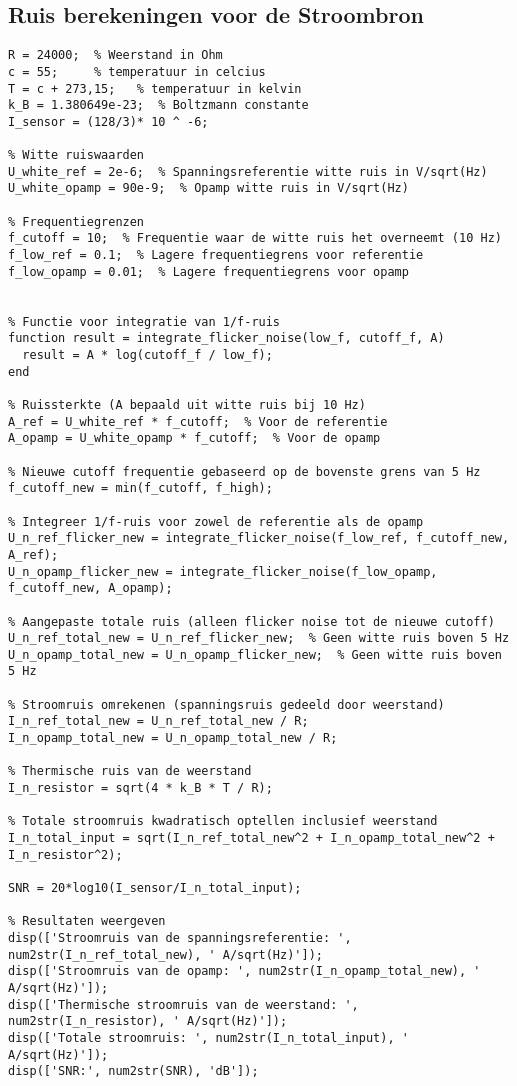 \subsection{Ruis berekeningen voor de Stroombron}
\begin{lstlisting}[caption={Octave code voor de ruis berekeningen van de Stroombron}, label={lst:octave_code_noise_current}]
% Gegeven waarden
R = 24000;  % Weerstand in Ohm
c = 55;     % temperatuur in celcius
T = c + 273,15;   % temperatuur in kelvin
k_B = 1.380649e-23;  % Boltzmann constante
I_sensor = (128/3)* 10 ^ -6;

% Witte ruiswaarden
U_white_ref = 2e-6;  % Spanningsreferentie witte ruis in V/sqrt(Hz)
U_white_opamp = 90e-9;  % Opamp witte ruis in V/sqrt(Hz)

% Frequentiegrenzen
f_cutoff = 10;  % Frequentie waar de witte ruis het overneemt (10 Hz)
f_low_ref = 0.1;  % Lagere frequentiegrens voor referentie
f_low_opamp = 0.01;  % Lagere frequentiegrens voor opamp


% Functie voor integratie van 1/f-ruis
function result = integrate_flicker_noise(low_f, cutoff_f, A)
  result = A * log(cutoff_f / low_f);
end

% Ruissterkte (A bepaald uit witte ruis bij 10 Hz)
A_ref = U_white_ref * f_cutoff;  % Voor de referentie
A_opamp = U_white_opamp * f_cutoff;  % Voor de opamp

% Nieuwe cutoff frequentie gebaseerd op de bovenste grens van 5 Hz
f_cutoff_new = min(f_cutoff, f_high);

% Integreer 1/f-ruis voor zowel de referentie als de opamp
U_n_ref_flicker_new = integrate_flicker_noise(f_low_ref, f_cutoff_new, A_ref);
U_n_opamp_flicker_new = integrate_flicker_noise(f_low_opamp, f_cutoff_new, A_opamp);

% Aangepaste totale ruis (alleen flicker noise tot de nieuwe cutoff)
U_n_ref_total_new = U_n_ref_flicker_new;  % Geen witte ruis boven 5 Hz
U_n_opamp_total_new = U_n_opamp_flicker_new;  % Geen witte ruis boven 5 Hz

% Stroomruis omrekenen (spanningsruis gedeeld door weerstand)
I_n_ref_total_new = U_n_ref_total_new / R;
I_n_opamp_total_new = U_n_opamp_total_new / R;

% Thermische ruis van de weerstand
I_n_resistor = sqrt(4 * k_B * T / R);

% Totale stroomruis kwadratisch optellen inclusief weerstand
I_n_total_input = sqrt(I_n_ref_total_new^2 + I_n_opamp_total_new^2 + I_n_resistor^2);

SNR = 20*log10(I_sensor/I_n_total_input);

% Resultaten weergeven
disp(['Stroomruis van de spanningsreferentie: ', num2str(I_n_ref_total_new), ' A/sqrt(Hz)']);
disp(['Stroomruis van de opamp: ', num2str(I_n_opamp_total_new), ' A/sqrt(Hz)']);
disp(['Thermische stroomruis van de weerstand: ', num2str(I_n_resistor), ' A/sqrt(Hz)']);
disp(['Totale stroomruis: ', num2str(I_n_total_input), ' A/sqrt(Hz)']);
disp(['SNR:', num2str(SNR), 'dB']);
\end{lstlisting}